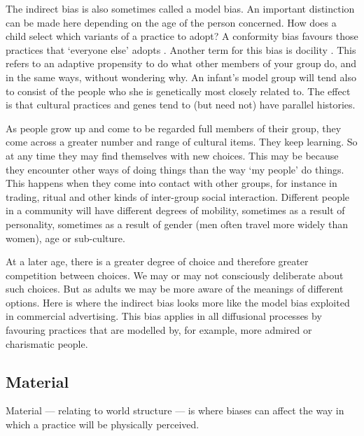 The indirect bias is also sometimes called a model bias. An important distinction can be made here depending on the age 
of the person concerned. How does a child select which variants of a 
practice to adopt? A conformity bias favours those practices that 
`everyone else' adopts \citep{boyd_culture_1985,gergely_sylvias_2006}. Another term for this bias is docility \citep{simon_mechanism_1990}. This refers to an 
adaptive propensity to do what other 
members of your group do, and in the same ways, without wondering why. An infant's model group will tend also to 
consist of the people who she is genetically most closely related to. 
The effect is that cultural practices and genes tend to (but need not) have 
parallel histories. 

As people grow up and come to be regarded full members of their group, they come across a greater number and range of cultural items. They keep learning. So at any time they may 
find themselves with new choices. This may be because they 
encounter other ways of doing things than the way \textquoteleft my people' do things. This happens when they come into contact with other groups, for instance in trading, 
ritual and other kinds of inter-group social interaction. Different 
people in a community will have different degrees of mobility, sometimes as a result of 
personality, sometimes as a result of gender (men often travel more 
widely than women), age or sub-culture. 



At a later age, there is a greater degree of choice and therefore 
greater competition between choices. We may or may not consciously 
deliberate about such choices. But as adults we may be more aware of the 
meanings of different options. Here is where the indirect bias looks 
more like the model bias exploited in commercial advertising. This bias applies in 
all diffusional processes by favouring practices 
that are modelled by, for example, more admired or charismatic people.


\subsection{Material}
Material --- relating to world structure --- is where biases can 
affect the way in which a practice will be physically perceived. 



